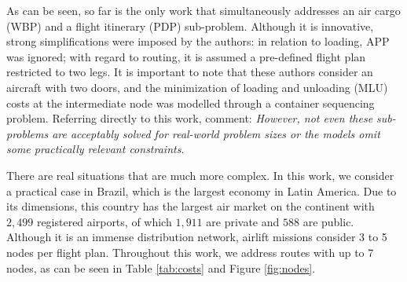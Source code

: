 \documentclass[preprint,authoryear]{elsarticle}
\begin{document}
As can be seen, so far \cite{LurkinSchyns2015} is the only work that simultaneously addresses an air cargo (WBP) and a flight itinerary (PDP) sub-problem. Although it is innovative, strong simplifications were imposed by the authors: in relation to loading, APP was ignored; with regard to routing, it is assumed a pre-defined flight plan restricted to two legs. It is important to note that these authors consider an aircraft with two doors, and the minimization of loading and unloading (MLU) costs at the intermediate node was modelled through a container sequencing problem. Referring directly to this work, \cite[p. 409]{BrandtStefan2019} comment: {\it However, not even these sub-problems are acceptably solved for real-world problem sizes or the models omit some practically relevant constraints}. 

There are real situations that are much more complex. In this work, we consider a practical case in Brazil, which is the largest economy in Latin America. Due to its dimensions, this country has the largest air market on the continent with $2,499$\/ registered airports, of which $1,911$\/ are private and $588$\/ are public. Although it is an immense distribution network, airlift missions consider 3 to 5 nodes per flight plan. Throughout this work, we address routes with up to 7 nodes, as can be seen in Table \ref{tab:costs} and Figure \ref{fig:nodes}.
\end{document}
